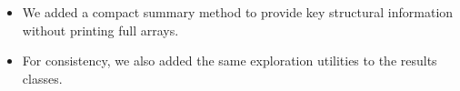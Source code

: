 \begin{itemize}
  \item We added a compact summary method to provide key structural
        information without printing full arrays.
  \item For consistency, we also added the same exploration utilities to
        the results classes.
\end{itemize}
